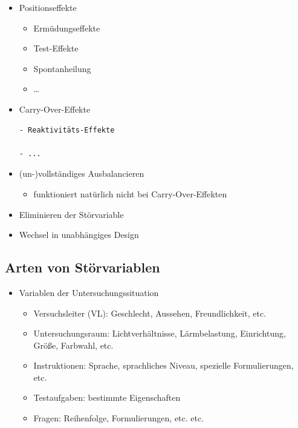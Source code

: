 \documentclass[
]{book}
\providecommand{\tightlist}{%
  \setlength{\itemsep}{0pt}\setlength{\parskip}{0pt}}
\begin{document}
\begin{itemize}
\item
  Positionseffekte

  \begin{itemize}
  \item
    Ermüdungseffekte
  \item
    Test-Effekte
  \item
    Spontanheilung
  \item
    \ldots{}
  \end{itemize}
\item
  Carry-Over-Effekte

\begin{verbatim}
- Reaktivitäts-Effekte

- ...
\end{verbatim}
\end{itemize}

\begin{itemize}
\item
  (un-)vollständiges Ausbalancieren

  \begin{itemize}
  \tightlist
  \item
    funktioniert natürlich nicht bei Carry-Over-Effekten
  \end{itemize}
\item
  Eliminieren der Störvariable
\item
  Wechsel in unabhängiges Design
\end{itemize}

\hypertarget{arten-von-stuxf6rvariablen-1}{%
\subsection{Arten von Störvariablen}\label{arten-von-stuxf6rvariablen-1}}

\begin{itemize}
\item
  Variablen der Untersuchungssituation

  \begin{itemize}
  \item
    Versuchsleiter (VL): Geschlecht, Aussehen, Freundlichkeit, etc.
  \item
    Untersuchungsraum: Lichtverhältnisse, Lärmbelastung, Einrichtung, Größe, Farbwahl, etc.
  \item
    Instruktionen: Sprache, sprachliches Niveau, spezielle Formulierungen, etc.
  \item
    Testaufgaben: bestimmte Eigenschaften
  \item
    Fragen: Reihenfolge, Formulierungen, etc. etc.
  \end{itemize}
\end{itemize}
\end{document}
